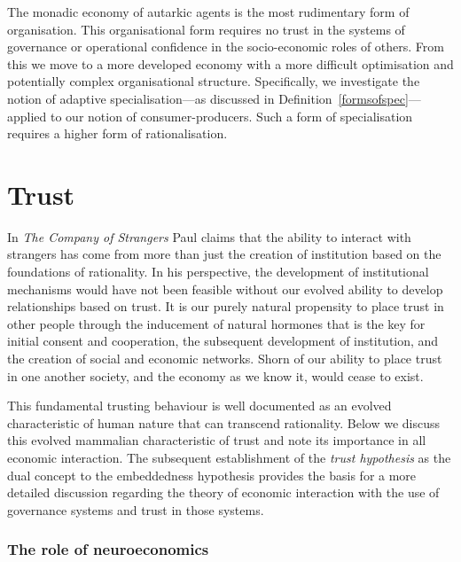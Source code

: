 \begin{subappendices}
The monadic economy of autarkic agents is the most rudimentary form of organisation. This organisational form requires no trust in the systems of governance or operational confidence in the socio-economic roles of others. From this we move to a more developed economy with a more difficult optimisation and potentially complex organisational structure. Specifically, we investigate the notion of adaptive specialisation---as discussed in Definition~\ref{formsofspec}---applied to our notion of consumer-producers. Such a form of specialisation requires a higher form of rationalisation.

\section{Trust}
\label{App:trust}

In \emph{The Company of Strangers} Paul \citet{Seabright2009} claims that the ability to interact with strangers has come from more than just the creation of institution based on the foundations of rationality. In his perspective, the development of institutional mechanisms would have not been feasible without our evolved ability to develop relationships based on trust. It is our purely natural propensity to place trust in other people through the inducement of natural hormones that is the key for initial consent and cooperation, the subsequent development of institution, and the creation of social and economic networks. Shorn of our ability to place trust in one another society, and the economy as we know it, would cease to exist.

This fundamental trusting behaviour is well documented as an evolved characteristic of human nature that can transcend rationality. Below we discuss this evolved mammalian characteristic of trust and note its importance in all economic interaction. The subsequent establishment of the \emph{trust hypothesis} as the dual concept to the embeddedness hypothesis provides the basis for a more detailed discussion regarding the theory of economic interaction with the use of governance systems and trust in those systems.

\subsubsection{The role of neuroeconomics}


\end{subappendices}
